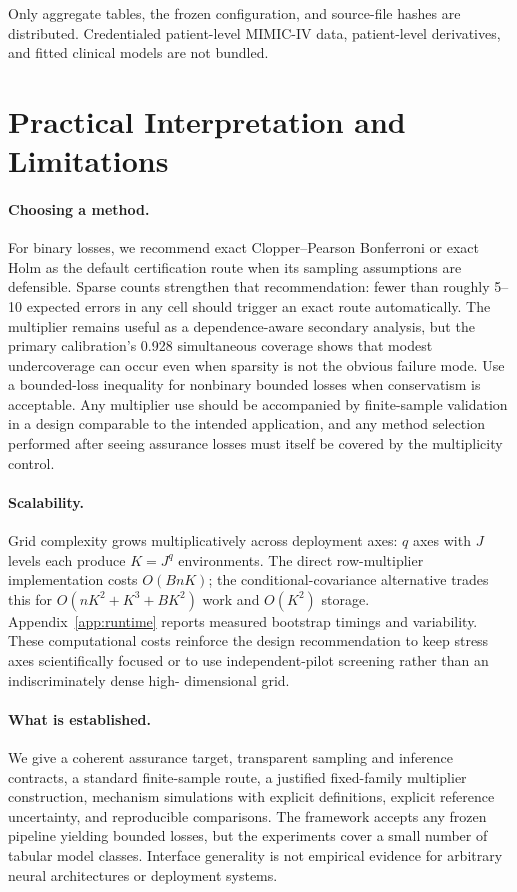 \documentclass[twoside,11pt]{article}
\begin{document}
Only aggregate tables, the frozen configuration, and source-file hashes are distributed.
Credentialed patient-level MIMIC-IV data, patient-level derivatives, and fitted clinical models
are not bundled.

\section{Practical Interpretation and Limitations}
\label{sec:discussion}
\paragraph{Choosing a method.}
For binary losses, we recommend exact Clopper--Pearson Bonferroni or exact Holm as the default
certification route when its sampling assumptions are defensible. Sparse counts strengthen
that recommendation: fewer than roughly 5--10 expected errors in any cell should trigger an
exact route automatically. The multiplier remains useful as a dependence-aware secondary
analysis, but the primary calibration's 0.928 simultaneous coverage shows that modest
undercoverage can occur even when sparsity is not the obvious failure mode. Use a bounded-loss
inequality for nonbinary bounded losses when conservatism is acceptable. Any multiplier use
should be accompanied by finite-sample validation in a design comparable to the intended
application, and any method selection performed after seeing assurance losses must itself be
covered by the multiplicity control.

\paragraph{Scalability.}
Grid complexity grows multiplicatively across deployment axes: $q$ axes with $J$ levels each
produce $K=J^q$ environments. The direct row-multiplier implementation costs $O(BnK)$; the
conditional-covariance alternative trades this for $O(nK^2+K^3+BK^2)$ work and $O(K^2)$
storage. Appendix~\ref{app:runtime} reports measured bootstrap timings and variability. These
computational costs reinforce the design recommendation to keep stress axes scientifically
focused or to use independent-pilot screening rather than an indiscriminately dense high-
dimensional grid.

\paragraph{What is established.}
We give a coherent assurance target, transparent sampling and inference contracts, a
standard finite-sample route, a justified fixed-family multiplier construction, mechanism
simulations with explicit definitions, explicit reference uncertainty, and reproducible
comparisons. The framework accepts any frozen pipeline yielding bounded losses, but the
experiments cover a small number of tabular model classes. Interface generality is not empirical
evidence for arbitrary neural architectures or deployment systems.
\end{document}
